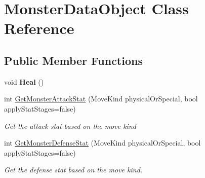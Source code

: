 \hypertarget{class_monster_data_object}{\section{Monster\-Data\-Object Class Reference}
\label{class_monster_data_object}
}
\subsection*{Public Member Functions}
\begin{DoxyCompactItemize}
\item 
\hypertarget{class_monster_data_object_ae98ad166b3e39dcf0dbb5f536bf26e75}{void {\bfseries Heal} ()}\label{class_monster_data_object_ae98ad166b3e39dcf0dbb5f536bf26e75}

\item 
int \hyperlink{class_monster_data_object_a6dd85baaa39abaac720a36b71db7536e}{Get\-Monster\-Attack\-Stat} (Move\-Kind physical\-Or\-Special, bool apply\-Stat\-Stages=false)
\begin{DoxyCompactList}\small\item\em Get the attack stat based on the move kind \end{DoxyCompactList}\item 
int \hyperlink{class_monster_data_object_a1eda550eeb621625d872b66b1c27eba7}{Get\-Monster\-Defense\-Stat} (Move\-Kind physical\-Or\-Special, bool apply\-Stat\-Stages=false)
\begin{DoxyCompactList}\small\item\em Get the defense stat based on the move kind. \end{DoxyCompactList}\end{DoxyCompactItemize}
